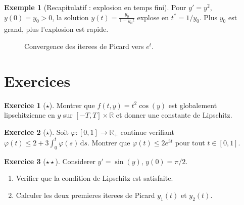 \documentclass[12pt,a4paper,openany]{book}
\theoremstyle{definition}
\newtheorem{exemple}[definition]{Exemple}
\newtheorem{exercice}{Exercice}[chapter]
\theoremstyle{plain}
\theoremstyle{remark}
\newcommand{\R}{\mathbb{R}}
\newcommand{\dd}{\mathrm{d}}
\begin{document}
\begin{exemple}[Recapitulatif : explosion en temps fini]\label{ex:recap-explosion}
Pour $y' = y^2$, $y(0) = y_0 > 0$, la solution $y(t) = \frac{y_0}{1 - y_0 t}$ explose en $t^* = 1/y_0$. Plus $y_0$ est grand, plus l'explosion est rapide.
\end{exemple}

\begin{figure}[ht]
\centering
{}
\caption{Convergence des iterees de Picard vers $e^t$.}\label{fig:picard-iterees}
\end{figure}

\section{Exercices}\label{sec:exos-ch3}

\begin{exercice}[$\star$]\label{exo:lipschitz-verif}
Montrer que $f(t, y) = t^2 \cos(y)$ est globalement lipschitzienne en $y$ sur $[-T, T] \times \R$ et donner une constante de Lipschitz.
\end{exercice}

\begin{exercice}[$\star$]\label{exo:gronwall-application}
Soit $\varphi : [0, 1] \to \R_+$ continue verifiant $\varphi(t) \leq 2 + 3\int_0^t \varphi(s)\, \dd s$. Montrer que $\varphi(t) \leq 2e^{3t}$ pour tout $t \in [0,1]$.
\end{exercice}

\begin{exercice}[$\star\star$]\label{exo:picard-sin}
Considerer $y' = \sin(y)$, $y(0) = \pi/2$.
\begin{enumerate}[label=(\alph*)]
  \item Verifier que la condition de Lipschitz est satisfaite.
  \item Calculer les deux premieres iterees de Picard $y_1(t)$ et $y_2(t)$.
\end{enumerate}
\end{exercice}
\end{document}

